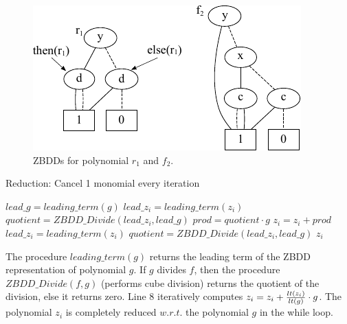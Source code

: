 \begin{figure}[hbt]
\centering
\includegraphics[scale=1]{Preliminaries-Theory/r1_f2.pdf}
\caption{ZBDDs for polynomial $r_1$ and $f_2$.}
\label{f2}
\end{figure}

\begin{algorithm}
\caption{Reduction: Cancel 1 monomial every iteration}
\label{singlemon}
\begin{algorithmic}[1]
{\small
{}
\State $lead\_g = leading\_term(g)$
\State $lead\_z_i = leading\_term(z_i)$
\State $quotient = ZBDD\_Divide(lead\_z_i,lead\_g)$
\State $prod = quotient \cdot g$
\State $z_i = z_i + prod$
\State $lead\_z_i = leading\_term(z_i)$
\State $quotient = ZBDD\_Divide(lead\_z_i,lead\_g)$
\EndWhile
\EndFor
\State \Return $z_i$
\EndProcedure
}
\end{algorithmic}
\end{algorithm}

The procedure $leading\_term(g)$ returns the leading term of 
the ZBDD representation of polynomial $g$. 
If $g$ divides $f$, then the procedure $ZBDD\_Divide(f,g)$ (performs cube division) returns the quotient of the
division,  else it returns zero. Line 8 iteratively computes $z_i = z_i +
{lt(z_i) \over lt(g)}\cdot g$. The polynomial $z_i$ is completely reduced
$w.r.t.$ the polynomial $g$ in the while loop. 

